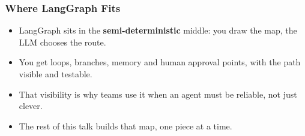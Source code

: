 

\begin{frame}[fragile]\frametitle{Where LangGraph Fits}
\begin{itemize}
\item LangGraph sits in the \textbf{semi-deterministic} middle: you draw the map, the LLM chooses the route.
\item You get loops, branches, memory and human approval points, with the path visible and testable.
\item That visibility is why teams use it when an agent must be reliable, not just clever.
\item The rest of this talk builds that map, one piece at a time.
\end{itemize}
\end{frame}

